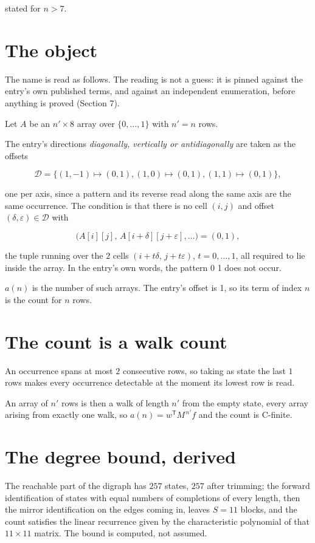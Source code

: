 \documentclass[11pt]{article}
\theoremstyle{definition}
\begin{document}
stated for $n > 7$.

\section{The object}

The name is read as follows. The reading is not a guess: it is pinned against the entry's own published terms, and against an independent enumeration, before anything is proved (Section 7).

Let $A$ be an $n' \times 8$ array over $\{0,\dots,1\}$ with $n' = n$ rows.

The entry's directions {\itshape diagonally, vertically or antidiagonally} are taken as the offsets

\[\mathcal{D} = \{(1,-1)\mapsto(0,1), (1,0)\mapsto(0,1), (1,1)\mapsto(0,1)\},\]

one per axis, since a pattern and its reverse read along the same axis are the same occurrence. The condition is that there is no cell $(i,j)$ and offset $(\delta,\varepsilon)\in\mathcal{D}$ with

\[\bigl(A[i][j],\,A[i{+}\delta][j{+}\varepsilon],\dots\bigr) = (0, 1),\]

the tuple running over the $2$ cells $(i+t\delta,\,j+t\varepsilon)$, $t = 0,\dots,1$, all required to lie inside the array. In the entry's own words, the pattern 0 1 does not occur.

$a(n)$ is the number of such arrays. The entry's offset is 1, so its term of index $n$ is the count for $n$ rows.

\section{The count is a walk count}

An occurrence spans at most $2$ consecutive rows, so taking as state the last $1$ rows makes every occurrence detectable at the moment its lowest row is read.

An array of $n'$ rows is then a walk of length $n'$ from the empty state, every array arising from exactly one walk, so $a(n) = w^{\mathsf T}M^{\,n'}f$ and the count is C-finite.

\section{The degree bound, derived}

The reachable part of the digraph has $257$ states, $257$ after trimming; the forward identification of states with equal numbers of completions of every length, then the mirror identification on the edges coming in, leaves $S = 11$ blocks, and the count satisfies the linear recurrence given by the characteristic polynomial of that $11\times11$ matrix. The bound is computed, not assumed.
\end{document}
